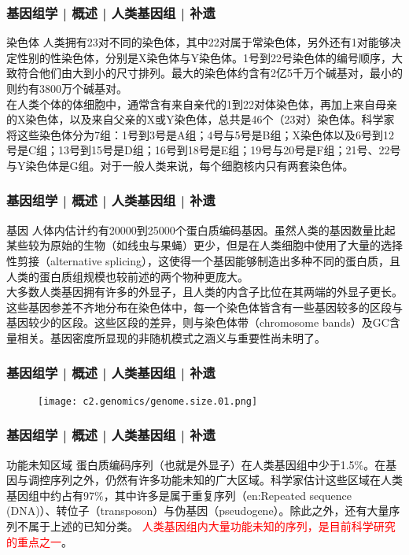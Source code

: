 \begin{frame}
  \frametitle{基因组学 | 概述 | 人类基因组 | 补遗}
  \begin{block}{染色体}
人类拥有23对不同的染色体，其中22对属于常染色体，另外还有1对能够决定性别的性染色体，分别是X染色体与Y染色体。1号到22号染色体的编号顺序，大致符合他们由大到小的尺寸排列。最大的染色体约含有2亿5千万个碱基对，最小的则约有3800万个碱基对。\\
\vspace{1em}
在人类个体的体细胞中，通常含有来自亲代的1到22对体染色体，再加上来自母亲的X染色体，以及来自父亲的X或Y染色体，总共是46个（23对）染色体。科学家将这些染色体分为7组：1号到3号是A组；4号与5号是B组；X染色体以及6号到12号是C组；13号到15号是D组；16号到18号是E组；19号与20号是F组；21号、22号与Y染色体是G组。对于一般人类来说，每个细胞核内只有两套染色体。
  \end{block}
\end{frame}

\begin{frame}
  \frametitle{基因组学 | 概述 | 人类基因组 | 补遗}
  \begin{block}{基因}
人体内估计约有20000到25000个蛋白质编码基因。虽然人类的基因数量比起某些较为原始的生物（如线虫与果蝇）更少，但是在人类细胞中使用了大量的选择性剪接（alternative splicing），这使得一个基因能够制造出多种不同的蛋白质，且人类的蛋白质组规模也较前述的两个物种更庞大。\\
\vspace{1em}
大多数人类基因拥有许多的外显子，且人类的内含子比位在其两端的外显子更长。这些基因参差不齐地分布在染色体中，每一个染色体皆含有一些基因较多的区段与基因较少的区段。这些区段的差异，则与染色体带（chromosome bands）及GC含量相关。基因密度所显现的非随机模式之涵义与重要性尚未明了。
  \end{block}
\end{frame}

\begin{frame}
  \frametitle{基因组学 | 概述 | 人类基因组 | 补遗}
  \begin{figure}
    \centering
    \texttt{[image: c2.genomics/genome.size.01.png]}
  \end{figure}
\end{frame}

\begin{frame}
  \frametitle{基因组学 | 概述 | 人类基因组 | 补遗}
  \begin{block}{功能未知区域}
    蛋白质编码序列（也就是外显子）在人类基因组中少于1.5\%。在基因与调控序列之外，仍然有许多功能未知的广大区域。科学家估计这些区域在人类基因组中约占有97\%，其中许多是属于重复序列（en:Repeated sequence (DNA)）、转位子（transposon）与伪基因（pseudogene）。除此之外，还有大量序列不属于上述的已知分类。 \textcolor{red}{人类基因组内大量功能未知的序列，是目前科学研究的重点之一}。
  \end{block}
\end{frame}


